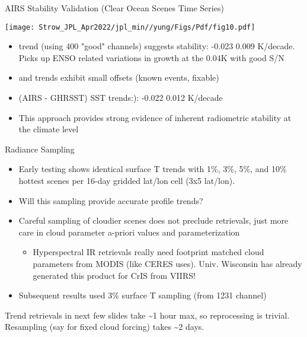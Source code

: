 \documentclass[10pt,t]{beamer}
\begin{document}
\begin{frame}[label={sec:orgf6503b1}]{AIRS Stability Validation (Clear Ocean Scenes Time Series)}
\vspace{-0.1in}
\begin{center}
\texttt{[image: Strow\_JPL\_Apr2022/jpl\_min//yung/Figs/Pdf/fig10.pdf]}
\end{center}

\vspace{-0.05in}
\footnotesize
\begin{itemize}
\item \cd trend (using 400 "good" channels) suggests stability:  -0.023 \textpm{} 0.009 K/decade.  Picks up ENSO related variations in \cd growth at the 0.04K with good S/N
\item \methane and \nitrous trends exhibit small offsets (known events, fixable)
\item (AIRS - GHRSST) SST trends:):  -0.022 \textpm{} 0.012 K/decade
\item This approach provides strong evidence of inherent radiometric stability at the climate level
\end{itemize}
\end{frame}

\begin{frame}[label={sec:orgc786a39}]{Radiance Sampling}
\begin{itemize}
\item Early testing shows identical surface T trends with 1\%, 3\%, 5\%, and 10\% hottest scenes per 16-day gridded lat/lon cell (3x5 lat/lon).
\item Will this sampling provide accurate profile trends?
\item Careful sampling of cloudier scenes does not preclude retrievals, just more care in cloud parameter a-priori values and parameterization
\begin{itemize}
\item Hyperspectral IR retrievals really need footprint matched cloud parameters from MODIS (like CERES uses).  Univ. Wisconsin has already generated this product for CrIS from VIIRS!
\end{itemize}
\item Subsequent results used 3\% surface T sampling (from 1231 \wn channel)

\vspace{0.1in}
\end{itemize}

Trend retrievals in next few slides take \textasciitilde{}1 hour max, so reprocessing is trivial.\\
  \vspace{0.1in}
Resampling (say for fixed cloud forcing) takes \textasciitilde{}2 days.  
\end{frame}
\end{document}

